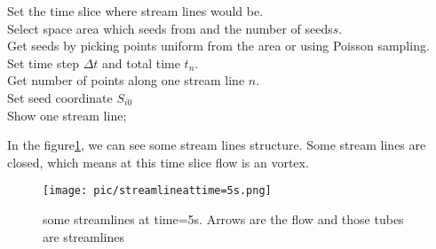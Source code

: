 \documentclass[
     11pt,         %
     a4paper,      %
     oneside,
     ]{article}
\begin{document}
	\begin{algorithm}[H]
		Set the time slice where stream lines would be.\\
		Select space area which seeds from and the number of seeds$s$.\\
		Get seeds by picking points uniform from the area or using Poisson sampling.\\ 
		Set time step $\Delta t$ and total time $t_{n}$. \\
		Get number of points along one stream line $n$.\\
		{
			Set seed coordinate $S_{i0}$\\
			Show one stream line;
			}
	\end{algorithm}
    In the figure\ref{fig:streamlineattime=5s}, we can see some stream lines structure. Some stream lines are closed, which means at this time slice flow is an vortex.
	\begin{figure}[H]
	\centering
	\texttt{[image: pic/streamlineattime=5s.png]}
	\caption{{\tiny some streamlines at time=5s. Arrows are the flow and those tubes are streamlines}}
	\label{fig:streamlineattime=5s}
	\end{figure}
	
\end{document}
